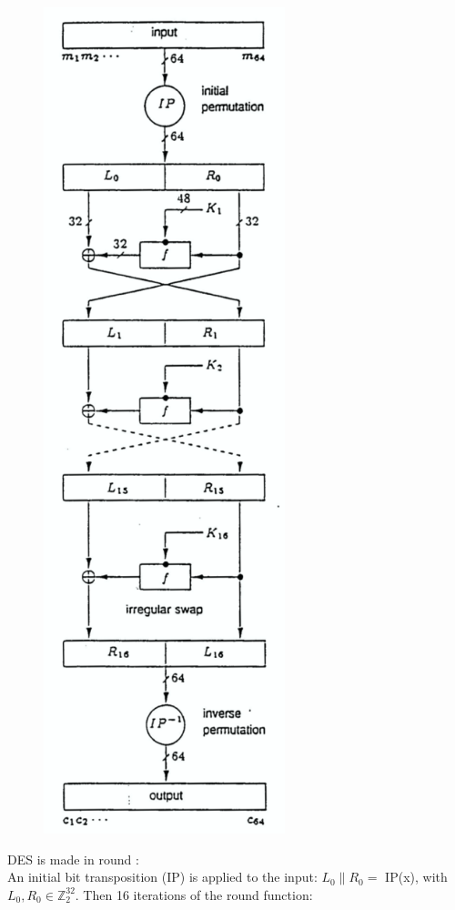 \documentclass[11pt,a4paper]{report}
\begin{document}
\begin{figure}
\vspace{-8mm}
\includegraphics[scale=0.25]{img/img3.png}
\end{figure}
DES is made in round :\\
An initial bit transposition (IP) is applied to the input: $L_0 \parallel R_0 =$ IP(x), with $L_0, R_0 \in \mathbb{Z}_2^{32}$. Then 16 iterations of the round function:\\
\end{document}

